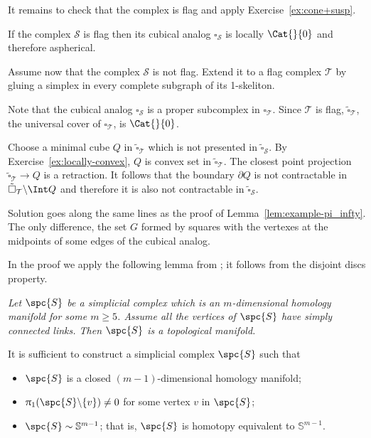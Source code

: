 It remains to check that the complex is flag 
and apply Exercise~\ref{ex:cone+susp}.
\qeds

If the complex $\mathcal{S}$ is flag then its cubical analog $\square_{\mathcal{S}}$ is locally $\Cat{}{0}$ and therefore aspherical.

Assume now that the complex $\mathcal{S}$ is not flag. 
Extend it to a flag complex $\mathcal{T}$ by gluing a simplex in every complete subgraph of its 1-skeliton.

Note that the cubical analog $\square_{\mathcal{S}}$ is a proper subcomplex in $\square_{\mathcal{T}}$.
Since $\mathcal{T}$ is flag,
$\tilde\square_{\mathcal{T}}$,
the universal cover of $\square_{\mathcal{T}}$, is $\Cat{}{0}$.

Choose a minimal cube $Q$ in $\tilde\square_{\mathcal{T}}$ which is not presented in $\tilde\square_{\mathcal{S}}$.
By Exercise~\ref{ex:locally-convex}, $Q$ is convex set in $\tilde\square_{\mathcal{T}}$.
The closest point projection $\tilde\square_{\mathcal{T}}\to Q$ is a retraction.
It follows that the boundary $\partial Q$ is not contractable in $\tilde\square_{\mathcal{T}}\backslash\Int Q$ and therefore it is also not contractable in $\tilde\square_{\mathcal{S}}$.
\qeds

Solution goes along the same lines as the proof of Lemma~\ref{lem:example-pi_infty}.
The only difference, the set $G$ formed by squares with the vertexes at the  midpoints of some edges of the cubical analog. 
\qeds

In the proof we apply the following lemma from \cite{edwards}; 
it follows from the disjoint discs property.

\medskip

\textit{Let $\spc{S}$ be a simplicial complex which 
is an $m$-dimensional homology manifold for some $m\ge 5$.
Assume all the vertices of
$\spc{S}$ have simply connected links.
Then $\spc{S}$ is a topological manifold.}

\medskip


It is sufficient to construct a simplicial complex $\spc{S}$
such that 
\begin{itemize}
\item $\spc{S}$ is a closed $(m-1)$-dimensional homology manifold;
\item $\pi_1(\spc{S}\backslash\{v\})\ne0$ for some vertex $v$ in $\spc{S}$;
\item $\spc{S}\sim \mathbb{S}^{m-1}$; that is, $\spc{S}$ is homotopy equivalent to $\mathbb{S}^{m-1}$.
\end{itemize}


